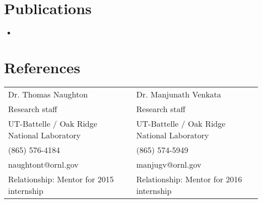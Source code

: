 \documentclass[10pt]{res}
\begin{document}
\begin{resume}
\section{Publications}
\begin{itemize}
    \item \cite {bob}
\end{itemize}

\section{References}
\vspace{2mm}
\begin{tabularx}{\textwidth}{X X}
Dr. Thomas Naughton  & Dr. Manjunath Venkata \\
Research staff & Research staff \\
UT-Battelle / Oak Ridge National Laboratory & UT-Battelle / Oak Ridge National Laboratory \\
(865) 576-4184 & (865) 574-5949 \\
naughtont@ornl.gov & manjugv@ornl.gov \\
Relationship: Mentor for 2015 internship & Relationship: Mentor for 2016 internship
\end{tabularx}

\end{resume}
\end{document}
